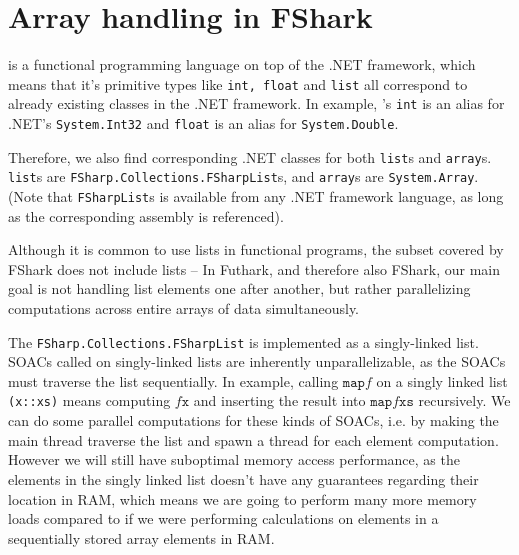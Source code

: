 \chapter{Array handling in FShark}
\fsharp{} is a functional programming language on top of the .NET framework, which
means that it's primitive types like \texttt{int, float} and \texttt{list} all
correspond to already existing classes in the .NET framework. In example,
\fsharp{}'s \texttt{int} is an alias for .NET's \texttt{System.Int32} and
\texttt{float} is an alias for \texttt{System.Double}.

Therefore, we also find corresponding .NET classes for both \fsharp{}
\texttt{list}s and \texttt{array}s. \texttt{list}s are
\texttt{FSharp.Collections.FSharpList}s, and \texttt{array}s are
\texttt{System.Array}. (Note that \texttt{FSharpList}s is available from any
.NET framework language, as long as the corresponding assembly is referenced).

Although it is common to use lists in functional programs, the \fsharp{} subset
covered by FShark does not include lists -- In Futhark, and therefore also
FShark, our main goal is not handling list elements one after another, but
rather parallelizing computations across entire arrays of data simultaneously.

The \texttt{FSharp.Collections.FSharpList} is implemented as a singly-linked
list. SOACs called on singly-linked lists are inherently unparallelizable, as
the SOACs must traverse the list sequentially.
In example, calling $\texttt{map} f$ on a singly linked list \texttt{(x::xs)}
means computing $f \texttt{x}$ and inserting the result into $\texttt{map} f
\texttt{xs}$ recursively. We can do some parallel computations for these kinds
of SOACs, i.e. by making the main thread traverse the list and spawn
a thread for each element computation. However we will still have suboptimal
memory access performance, as the elements in the singly linked list doesn't
have any guarantees regarding their location in RAM, which means we are going to
perform many more memory loads compared to if we were performing calculations on
elements in a sequentially stored array elements in RAM.











